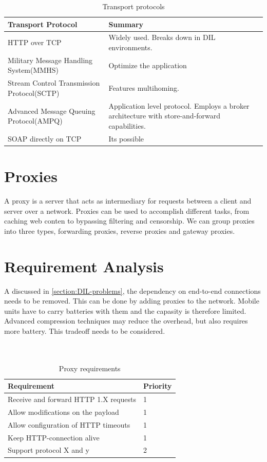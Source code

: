 \documentclass[USenglish]{article}
\begin{document}
\begin{table}[h]
\begin{tabularx}{\textwidth}{| X | X |}
\hline
  \textbf{Transport Protocol} & \textbf{Summary} \\ \hline
  HTTP over TCP & Widely used. Breaks down in DIL environments.\\ \hline
  Military Message Handling System(MMHS) & Optimize the application\\ \hline
  Stream Control Transmission Protocol(SCTP) & Features multihoming. \\ \hline
  Advanced Message Queuing Protocol(AMPQ) & Application level protocol. Employs a broker architecture with store-and-forward capabilities. \\ \hline
  SOAP directly on TCP & Its possible \\ \hline
\end{tabularx}
\caption{Transport protocols}
\end{table}

\section{Proxies}
A proxy is a server that acts as intermediary for requests between a client and server over a network. Proxies can be used to accomplish different tasks, from caching web conten to bypassing filtering and censorship. We can group proxies into three types, forwarding proxies, reverse proxies and gateway proxies.

\section{Requirement Analysis}
A discussed in \cref{section:DIL-problems}, the dependency on end-to-end connections needs to be removed. This can be done by adding proxies to the network.
Mobile units have to carry batteries with them and the capasity is therefore limited. Advanced compression techniques may reduce the overhead, but also requires more battery. This tradeoff needs to be considered.
\\ \\ \\
\begin{table}[h]
\begin{tabular}{| l | l |}
\hline
  \textbf{Requirement} & \textbf{Priority} \\ \hline
  Receive and forward HTTP 1.X requests & 1\\ \hline
  Allow modifications on the payload & 1 \\ \hline
  Allow configuration of HTTP timeouts & 1 \\ \hline
  Keep HTTP-connection alive & 1 \\ \hline
  Support protocol X and y & 2 \\ \hline
\end{tabular}
\caption{Proxy requirements}
\end{table}
\end{document}
